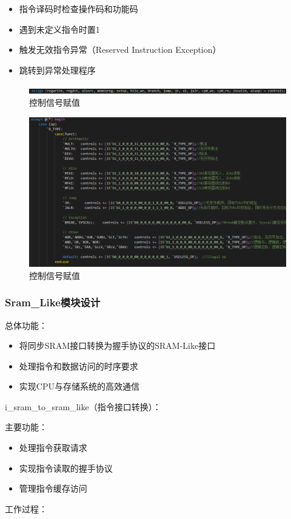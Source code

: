 \begin{itemize}
\item 指令译码时检查操作码和功能码
\item 遇到未定义指令时置1
\item 触发无效指令异常（Reserved Instruction Exception）
\item 跳转到异常处理程序

\end{itemize}


\begin{figure}
\centering
\includegraphics[width=0.5\linewidth]{image/p9.png}
\caption{控制信号赋值}
\label{fig:enter-label}
\end{figure}

\begin{figure}
\centering
\includegraphics[width=0.5\linewidth]{image/p10.png}
\caption{控制信号赋值}
\label{fig:enter-label}
\end{figure}

\subsubsection{Sram\_Like模块设计}
总体功能：
\begin{itemize}
\item 将同步SRAM接口转换为握手协议的SRAM-Like接口
\item 处理指令和数据访问的时序要求
\item 实现CPU与存储系统的高效通信
\end{itemize}

i\_sram\_to\_sram\_like（指令接口转换）：

主要功能：

\begin{itemize}
\item 处理指令获取请求
\item 实现指令读取的握手协议
\item 管理指令缓存访问
\end{itemize}
工作过程：

